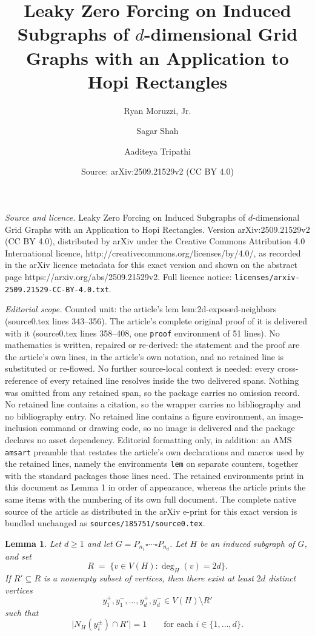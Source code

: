 \documentclass[10pt,a4paper]{amsart}
\title{Leaky Zero Forcing on Induced Subgraphs of $d$-dimensional Grid Graphs with an Application to Hopi Rectangles}
\author{Ryan Moruzzi, Jr. \and Sagar Shah \and Aaditeya Tripathi}
\date{Source: arXiv:2509.21529v2 (CC BY 4.0)}
\newtheorem{lem}{Lemma}
\begin{document}
\maketitle

\noindent\emph{Source and licence.} Leaky Zero Forcing on Induced Subgraphs of $d$-dimensional Grid Graphs with an Application to Hopi Rectangles. Version arXiv:2509.21529v2 (CC BY 4.0), distributed by arXiv under the Creative Commons Attribution 4.0 International licence, http://creativecommons.org/licenses/by/4.0/, as recorded in the arXiv licence metadata for this exact version and shown on the abstract page https://arxiv.org/abs/2509.21529v2. Full licence notice: \texttt{licenses/arxiv-2509.21529-CC-BY-4.0.txt}.\par\smallskip

\noindent\textit{Editorial scope.} Counted unit: the article's lem lem:2d-exposed-neighbors (source0.tex lines 343--356). The article's complete original proof of it is delivered with it (source0.tex lines 358--408, one \texttt{proof} environment of 51 lines). No mathematics is written, repaired or re-derived: the statement and the proof are the article's own lines, in the article's own notation, and no retained line is substituted or re-flowed.  No further source-local context is needed: every cross-reference of every retained line resolves inside the two delivered spans.  Nothing was omitted from any retained span, so the package carries no omission record.  No retained line contains a citation, so the wrapper carries no bibliography and no bibliography entry.  No retained line contains a figure environment, an image-inclusion command or drawing code, so no image is delivered and the package declares no asset dependency.  Editorial formatting only, in addition: an AMS \texttt{amsart} preamble that restates the article's own declarations and macros used by the retained lines, namely the environments \texttt{lem} on separate counters, together with the standard packages those lines need.  The retained environments print in this document as Lemma 1 in order of appearance, whereas the article prints the same items with the numbering of its own full document.  The complete native source of the article as distributed in the arXiv e-print for this exact version is bundled unchanged as \texttt{sources/185751/source0.tex}.
\begin{lem}\label{lem:2d-exposed-neighbors}
Let $d\ge 1$ and let $G = P_{n_1}\square \cdots \square P_{n_d}$. Let $H$ be an induced subgraph of $G$, and set
\[
R \;=\; \{v\in V(H): \deg_H(v)=2d\}.
\]
If $R'\subseteq R$ is a nonempty subset of vertices, then there exist at least $2d$ \emph{distinct} vertices
\[
y_1^+,y_1^-,\dots,y_d^+,y_d^- \in V(H)\setminus R'
\]
such that
\[
\bigl|N_H(y_i^\pm)\cap R'\bigr|=1 \qquad \text{for each } i\in\{1,\dots,d\}.
\]
\end{lem}
\end{document}
